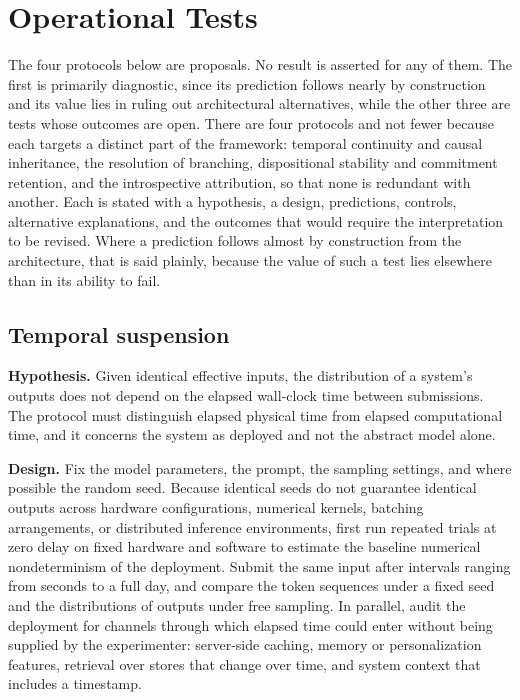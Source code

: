 \documentclass[12pt]{article}
\theoremstyle{definition}
\theoremstyle{plain}
\begin{document}
\section{Operational Tests}

The four protocols below are proposals. No result is asserted for any of them. The first is primarily diagnostic, since its prediction follows nearly by construction and its value lies in ruling out architectural alternatives, while the other three are tests whose outcomes are open. There are four protocols and not fewer because each targets a distinct part of the framework: temporal continuity and causal inheritance, the resolution of branching, dispositional stability and commitment retention, and the introspective attribution, so that none is redundant with another. Each is stated with a hypothesis, a design, predictions, controls, alternative explanations, and the outcomes that would require the interpretation to be revised. Where a prediction follows almost by construction from the architecture, that is said plainly, because the value of such a test lies elsewhere than in its ability to fail.

\subsection{Temporal suspension}

\textbf{Hypothesis.} Given identical effective inputs, the distribution of a system's outputs does not depend on the elapsed wall-clock time between submissions. The protocol must distinguish elapsed physical time from elapsed computational time, and it concerns the system as deployed and not the abstract model alone.

\textbf{Design.} Fix the model parameters, the prompt, the sampling settings, and where possible the random seed. Because identical seeds do not guarantee identical outputs across hardware configurations, numerical kernels, batching arrangements, or distributed inference environments, first run repeated trials at zero delay on fixed hardware and software to estimate the baseline numerical nondeterminism of the deployment. Submit the same input after intervals ranging from seconds to a full day, and compare the token sequences under a fixed seed and the distributions of outputs under free sampling. In parallel, audit the deployment for channels through which elapsed time could enter without being supplied by the experimenter: server-side caching, memory or personalization features, retrieval over stores that change over time, and system context that includes a timestamp.
\end{document}
